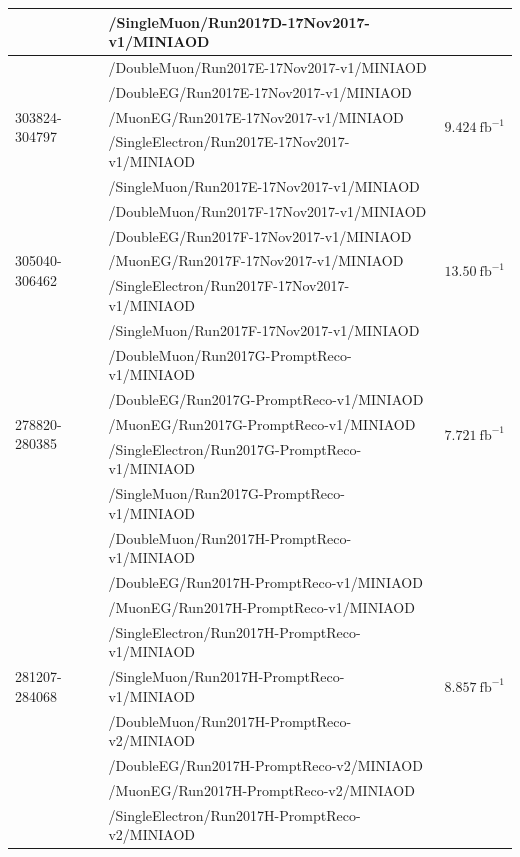 \begin{table}[h]
\begin{tabular}{|l|l|l|}
& /SingleMuon/Run2017D-17Nov2017-v1/MINIAOD &  \\ 
\hline
\multirow{5}{*}{303824-304797} & /DoubleMuon/Run2017E-17Nov2017-v1/MINIAOD &  \multirow{5}{*}{$9.424\ \text{fb}^{-1}$} \\ 
& /DoubleEG/Run2017E-17Nov2017-v1/MINIAOD &  \\ 
& /MuonEG/Run2017E-17Nov2017-v1/MINIAOD &  \\ 
& /SingleElectron/Run2017E-17Nov2017-v1/MINIAOD &  \\ 
& /SingleMuon/Run2017E-17Nov2017-v1/MINIAOD &  \\ 
\hline
\multirow{5}{*}{305040-306462} & /DoubleMuon/Run2017F-17Nov2017-v1/MINIAOD &  \multirow{5}{*}{$13.50\ \text{fb}^{-1}$} \\ 
& /DoubleEG/Run2017F-17Nov2017-v1/MINIAOD &  \\ 
& /MuonEG/Run2017F-17Nov2017-v1/MINIAOD &  \\ 
& /SingleElectron/Run2017F-17Nov2017-v1/MINIAOD &  \\ 
& /SingleMuon/Run2017F-17Nov2017-v1/MINIAOD &  \\ 
\hline
\multirow{5}{*}{278820-280385} & /DoubleMuon/Run2017G-PromptReco-v1/MINIAOD &  \multirow{5}{*}{$7.721\ \text{fb}^{-1}$} \\ 
 & /DoubleEG/Run2017G-PromptReco-v1/MINIAOD &  \\ 
 & /MuonEG/Run2017G-PromptReco-v1/MINIAOD &  \\ 
 & /SingleElectron/Run2017G-PromptReco-v1/MINIAOD &  \\ 
 & /SingleMuon/Run2017G-PromptReco-v1/MINIAOD &  \\ 
 \hline
 \multirow{15}{*}{281207-284068} & /DoubleMuon/Run2017H-PromptReco-v1/MINIAOD &  \multirow{15}{*}{$8.857\ \text{fb}^{-1}$} \\ 
 & /DoubleEG/Run2017H-PromptReco-v1/MINIAOD &  \\ 
 & /MuonEG/Run2017H-PromptReco-v1/MINIAOD &  \\ 
 & /SingleElectron/Run2017H-PromptReco-v1/MINIAOD &  \\ 
 & /SingleMuon/Run2017H-PromptReco-v1/MINIAOD &  \\ 
 & /DoubleMuon/Run2017H-PromptReco-v2/MINIAOD &  \\ 
 & /DoubleEG/Run2017H-PromptReco-v2/MINIAOD &  \\ 
 & /MuonEG/Run2017H-PromptReco-v2/MINIAOD &  \\ 
 & /SingleElectron/Run2017H-PromptReco-v2/MINIAOD &  \\ 

\end{tabular}
\end{table}

